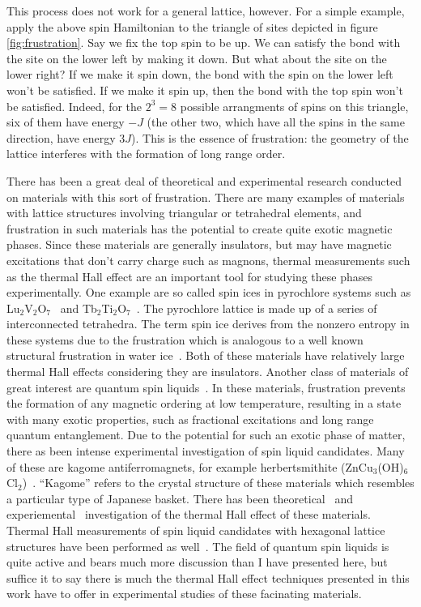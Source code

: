 \documentclass{thesis-umich}
\begin{document}
This process does not work for a general lattice, however. For a simple example, apply the above spin Hamiltonian to the triangle of sites depicted in figure \ref{fig:frustration}. Say we fix the top spin to be up. We can satisfy the bond with the site on the lower left by making it down. But what about the site on the lower right? If we make it spin down, the bond with the spin on the lower left won't be satisfied. If we make it spin up, then the bond with the top spin won't be satisfied. Indeed, for the $2^3 = 8$ possible arrangments of spins on this triangle, six of them have energy $-J$ (the other two, which have all the spins in the same direction, have energy $3J$). This is the essence of frustration: the geometry of the lattice interferes with the formation of long range order.

There has been a great deal of theoretical and experimental research conducted on materials with this sort of frustration. There are many examples of materials with lattice structures involving triangular or tetrahedral elements, and frustration in such materials has the potential to create quite exotic magnetic phases. Since these materials are generally insulators, but may have magnetic excitations that don't carry charge such as magnons, thermal measurements such as the thermal Hall effect are an important tool for studying these phases experimentally. One example are so called spin ices in pyrochlore systems such as Lu$_2$V$_2$O$_7$~\cite{Onose2010} and Tb$_2$Ti$_2$O$_7$~\cite{Hirschberger2015}. The pyrochlore lattice is made up of a series of interconnected tetrahedra. The term spin ice derives from the nonzero entropy in these systems due to the frustration which is analogous to a well known structural frustration in water ice~\cite{Giauque1936}. Both of these materials have relatively large thermal Hall effects considering they are insulators. Another class of materials of great interest are quantum spin liquids~\cite{Anderson1973}. In these materials, frustration prevents the formation of any magnetic ordering at low temperature, resulting in a state with many exotic properties, such as fractional excitations and long range quantum entanglement. Due to the potential for such an exotic phase of matter, there as been intense experimental investigation of spin liquid candidates. Many of these are kagome antiferromagnets, for example herbertsmithite (ZnCu$_3$(OH)$_6$Cl$_2$)~\cite{Asaba2014}. ``Kagome'' refers to the crystal structure of these materials which resembles a particular type of Japanese basket. There has been theoretical~\cite{Owerre2017} and experiemental~\cite{Doki2018} investigation of the thermal Hall effect of these materials. Thermal Hall measurements of spin liquid candidates with hexagonal lattice structures have been performed as well~\cite{Kasahara2018}. The field of quantum spin liquids is quite active and bears much more discussion than I have presented here, but suffice it to say there is much the thermal Hall effect techniques presented in this work have to offer in experimental studies of these facinating materials.
\end{document}
